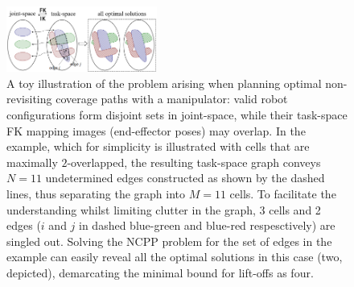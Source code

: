 \documentclass[conference]{IEEEtran}
\begin{document}

\begin{figure}[t]
\centering
\includegraphics[width = 0.44\textwidth]{figures/mapping_2}
\caption{A toy illustration of the problem arising when planning optimal non-revisiting coverage paths with a manipulator: valid robot configurations form disjoint sets in joint-space, while their task-space FK mapping images (end-effector poses) may overlap. 
In the example, which for simplicity is illustrated with cells that are maximally $2$-overlapped, the resulting task-space graph 
conveys $N = 11$ undetermined edges constructed as shown by the dashed lines, thus separating the graph into $M = 11$ cells.
To facilitate the understanding whilst limiting clutter in the graph, 3 cells and 2 edges ($i$ and $j$ in dashed blue-green and blue-red respesctively) are singled out.
Solving the NCPP problem for the set of edges in the example can easily reveal all the optimal solutions in this case (two, depicted), demarcating the minimal bound for lift-offs as four. 
}
\end{figure}
\end{document}
